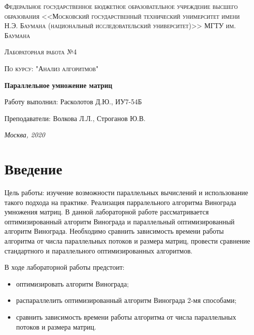 \documentclass[12pt]{report}
\begin{document}
\begin{titlepage}
	\centering
	{\scshape\LARGE Федеральное государственное бюджетное образовательное учреждение высшего образования <<Московский государственный технический унимерситет имени Н.Э. Баумана (национальный исследовательский университет)>> МГТУ им. Баумана \par}
	\vspace{2cm}
	{\scshape\Large Лабораторная работа №4\par}
	\vspace{0.5cm}	
	{\scshape\Large По курсу: "Анализ алгоритмов"\par}
	\vspace{1.5cm}
	{\huge\bfseries Параллельное умножение матриц\par}
	\vspace{2cm}
	\Large Работу выполнил: Расколотов Д.Ю., ИУ7-54Б\par
	\vspace{0.5cm}
	\Large Преподаватели:  Волкова Л.Л., Строганов Ю.В.\par
	\vfill
	\large \textit {Москва, 2020} \par
\end{titlepage}

\tableofcontents

\newpage
\chapter*{Введение}
Цель работы: изучение возможности параллельных вычислений и использование такого подхода на практике. Реализация парралельного алгоритма Винограда умножения матриц. В данной лабораторной работе рассматривается оптимизированный алгоритм Винограда и параллельный оптимизированный алгоритм Винограда. Необходимо сравнить зависимость времени работы алгоритма от числа параллельных потоков и размера матриц, провести сравнение стандартного и параллельного оптимизированных алгоритмов.



В ходе лабораторной работы предстоит:
\begin{itemize}
	\item оптимизировать алгоритм Винограда; 
	\item распараллелить оптимизированный алгоритм Винограда 2-мя способами;
	\item сравнить зависимость времени работы алгоритма от числа параллельных потоков и размера матриц.
\end{itemize}
\end{document}
